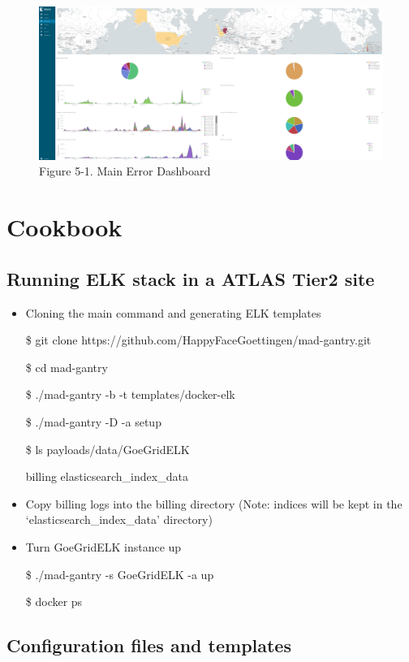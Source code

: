 \documentclass[]{article}
\begin{document}
\begin{figure}[htbp]
\centering
\includegraphics{images/kibana_error.png}
\caption{Figure 5-1. Main Error Dashboard}
\end{figure}

\section{Cookbook}\label{cookbook}

\subsection{Running ELK stack in a ATLAS Tier2
site}\label{running-elk-stack-in-a-atlas-tier2-site}

\begin{itemize}
\item
  Cloning the main command and generating ELK templates

  \$ git clone https://github.com/HappyFaceGoettingen/mad-gantry.git

  \$ cd mad-gantry

  \$ ./mad-gantry -b -t templates/docker-elk

  \$ ./mad-gantry -D -a setup

  \$ ls payloads/data/GoeGridELK

  billing elasticsearch\_index\_data
\item
  Copy billing logs into the billing directory (Note: indices will be
  kept in the `elasticsearch\_index\_data' directory)
\item
  Turn GoeGridELK instance up

  \$ ./mad-gantry -s GoeGridELK -a up

  \$ docker ps
\end{itemize}

\subsection{Configuration files and
templates}\label{configuration-files-and-templates}
\end{document}
